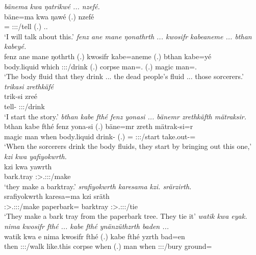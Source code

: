 \clearpage
\begin{exe}
	\emph{bänema kwa ŋatrikwé ... nzefé.}\\
	\gll bäne=ma kwa ŋawé (.) nzefé\\
	\Recog=\Char{} \Fut{} \Fsg:\Sbj:\Nonpast:\Ipfv/tell (.) \Fsg.\Erg.\Emph\\
	\trans `I will talk about this.'
	\emph{fenz ane mane ŋonathrth ... kwosifr kabeaneme ... bthan kabeyé.}\\
	\gll fenz ane mane ŋothrth (.) kwosifr kabe=aneme (.) bthan kabe=yé\\
	body.liquid \Dem{} which \Stpl:\Sbj:\Nonpast:\Ipfv/drink (.) corpse man=\Poss.\Nsg{} (.) magic man=\Erg.\Nsg\\
	\trans `The body fluid that they drink ... the dead people's fluid ... those sorcerers.'
	\emph{trikasi zrethkäfé}\\
	\gll trik-si zreé\\
	tell-\Nmlz{} \Stpl:\Sbj:\Irr:\Pfv/drink\\
	\trans `I start the story.'
	\emph{bthan kabe fthé fenz yonasi ... bänemr zrethkäfth mätraksir.}\\
	\gll bthan kabe fthé fenz yona-si (.) bäne=mr zreth mätrak-si=r\\
	magic man when body.liquid drink-\Nmlz{} (.) \Recog=\Purp{} \Stpl:\Sbj:\Irr:\Pfv/start take.out-\Nmlz=\Purp\\
	\trans `When the sorcerers drink the body fluids, they start by bringing out this one,'
	\emph{kzi kwa yafiyokwrth.}\\
	\gll kzi kwa yawrth\\
	bark.tray \Fut{} \Stpl:\Sbj>\Tsg.\Masc:\Obj:\Nonpast:\Ipfv/make\\
	\trans `they make a barktray.'
	\emph{srafiyokwrth karesama kzi. srärzirth.}\\
	\gll srafiyokwrth karesa=ma kzi sräth\\
	\Stpl:\Sbj>\Tsg.\Masc:\Obj:\Irr:\Ipfv/make paperbark=\Char{} barktray \Stpl:\Sbj>\Tsg.\Masc:\Obj:\Irr:\Pfv/tie\\
	\trans `They make a bark tray from the paperbark tree. They tie it'
	\emph{watik kwa eyak. nima kwosifr fthé ... kabe fthé ynänzüthzrth baden ...}\\
	\gll watik kwa e nima kwosifr fthé (.) kabe fthé yzrth bad=en\\
	then \Fut{} \Stpl:\Sbj:\Nonpast:\Ipfv/walk like.this corpse when (.) man when \Stpl:\Sbj:\Nonpast:\Ipfv/bury ground=\Loc\\

\end{exe}
